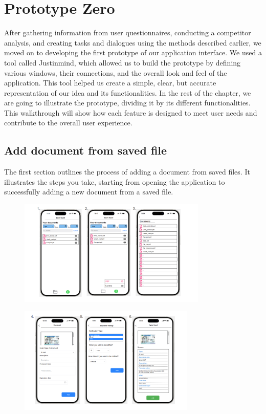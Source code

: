 \section{Prototype Zero}
After gathering information from user questionnaires, conducting a competitor analysis, and creating tasks and dialogues using the methods described earlier, we moved on to developing the first prototype of our application interface. We used a tool called Justinmind, which allowed us to build the prototype by defining various windows, their connections, and the overall look and feel of the application. This tool helped us create a simple, clear, but accurate representation of our idea and its functionalities.
In the rest of the chapter, we are going to illustrate the prototype, dividing it by its different functionalities. This walkthrough will show how each feature is designed to meet user needs and contribute to the overall user experience.
	\subsection{Add document from saved file}
		The first section outlines the process of adding a document from saved files. It illustrates the steps you take, starting from opening the application to successfully adding a new document from a saved file.
		\begin{figure}[htbp]
			\centering
			\includegraphics[width=0.80\textwidth]{../mockups/add_doc_pdf_1.png}  %
		\end{figure}
		
		\begin{figure}[htbp]
			\centering
			\includegraphics[width=0.75\textwidth]{../mockups/add_doc_pdf_2.png}  %
		\end{figure}
		\clearpage

